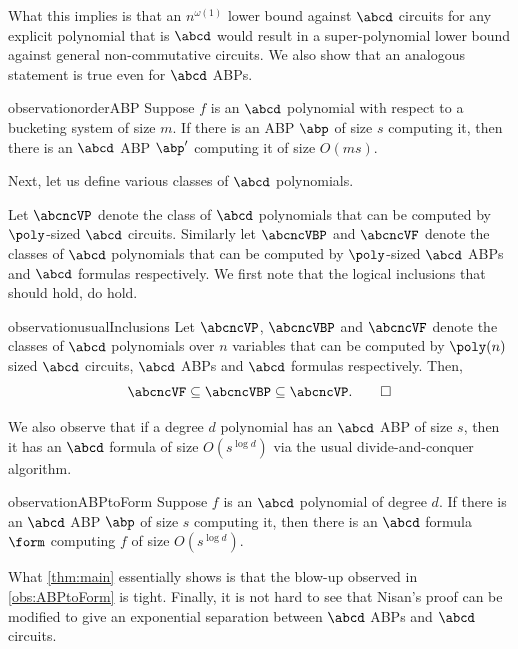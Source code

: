 \noindent What this implies is that an $n^{\omega(1)}$ lower bound against $\abcd$ circuits for any explicit polynomial that is $\abcd$ would result in a super-polynomial lower bound against general non-commutative circuits.
We also show that an analogous statement is true even for $\abcd$ ABPs.

\begin{restatable}{observation}{orderABP}\label{obs:orderABP}
	Suppose $f$ is an $\abcd$ polynomial with respect to a bucketing system of size $m$. If there is an ABP $\abp$ of size $s$ computing it, then there is an $\abcd$ ABP $\abp'$ computing it of size $O(ms)$.
\end{restatable}

\noindent Next, let us define various classes of $\abcd$ polynomials. 

Let $\abcncVP$ denote the class of $\abcd$ polynomials that can be computed by $\poly$-sized $\abcd$ circuits. 
Similarly let $\abcncVBP$ and $\abcncVF$ denote the classes of $\abcd$ polynomials that can be computed by $\poly$-sized $\abcd$ ABPs and $\abcd$ formulas respectively. 
We first note that the logical inclusions that should hold, do hold.

\begin{restatable}{observation}{usualInclusions}\label{obs:usualInclusions}
	Let $\abcncVP$, $\abcncVBP$ and $\abcncVF$ denote the classes of $\abcd$ polynomials over $n$ variables that can be computed by $\poly(n)$ sized $\abcd$ circuits, $\abcd$ ABPs and $\abcd$ formulas respectively.
	Then,
	\[
		\abcncVF \subseteq \abcncVBP \subseteq \abcncVP. \qedhere	
	\]
\end{restatable}

\noindent We also observe that if a degree $d$ polynomial has an $\abcd$ ABP of size $s$, then it has an $\abcd$ formula of size $O(s^{\log d})$ via the usual divide-and-conquer algorithm. 

\begin{restatable}{observation}{ABPtoForm}\label{obs:ABPtoForm}
	Suppose $f$ is an $\abcd$ polynomial of degree $d$. If there is an $\abcd$ ABP $\abp$ of size $s$ computing it, then there is an $\abcd$ formula $\form$ computing $f$ of size $O(s^{\log d})$.
\end{restatable}

\noindent What \autoref{thm:main} essentially shows is that the blow-up observed in \autoref{obs:ABPtoForm} is tight.
Finally, it is not hard to see that Nisan's proof can be modified to give an exponential separation between $\abcd$ ABPs and $\abcd$ circuits. 

